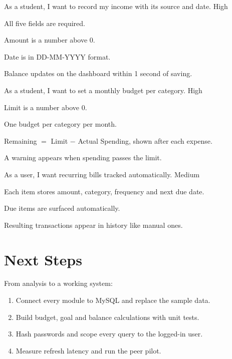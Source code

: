 \documentclass[12pt,a4paper]{article}
\begin{document}
  {As a student, I want to record my income with its source and date.}
  {High}
  {\item All five fields are required.
   \item Amount is a number above 0.
   \item Date is in DD-MM-YYYY format.
   \item Balance updates on the dashboard within 1 second of saving.}

  {As a student, I want to set a monthly budget per category.}
  {High}
  {\item Limit is a number above 0.
   \item One budget per category per month.
   \item Remaining $=$ Limit $-$ Actual Spending, shown after each expense.
   \item A warning appears when spending passes the limit.}

  {As a user, I want recurring bills tracked automatically.}
  {Medium}
  {\item Each item stores amount, category, frequency and next due date.
   \item Due items are surfaced automatically.
   \item Resulting transactions appear in history like manual ones.}

\section{Next Steps}
From analysis to a working system:
\begin{enumerate}[label=\arabic*.]
  \item Connect every module to MySQL and replace the sample data.
  \item Build budget, goal and balance calculations with unit tests.
  \item Hash passwords and scope every query to the logged-in user.
  \item Measure refresh latency and run the peer pilot.
\end{enumerate}
\end{document}
